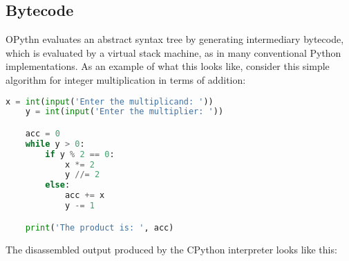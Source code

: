 \documentclass[11pt, twoside]{article}
\begin{document}
    \subsection{Bytecode}
    OPythn evaluates an abstract syntax tree by generating intermediary bytecode, which is evaluated by a virtual stack machine, as in many conventional Python implementations. As an example of what this looks like, consider this simple algorithm for integer multiplication in terms of addition:
    \begin{lstlisting}[language=python]
    x = int(input('Enter the multiplicand: '))
    y = int(input('Enter the multiplier: '))

    acc = 0
    while y > 0:
        if y % 2 == 0:
            x *= 2
            y //= 2
        else:
            acc += x
            y -= 1

    print('The product is: ', acc)
    \end{lstlisting}
    The disassembled output produced by the CPython interpreter looks like this:
\end{document}
